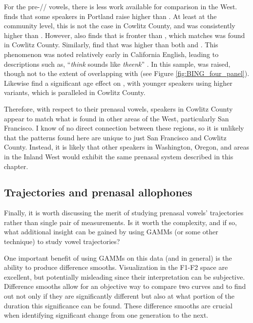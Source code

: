 For the pre-// vowels, there is less work available for comparison in the West. \citet[46]{conn_2000_diss} finds that some speakers in Portland raise \ban higher than \bang. At least at the community level, this is not the case in Cowlitz County, and \bang was consistently higher than \ban. However, \citet{conn_2000_diss} also finds that \bang is fronter than \ban, which matches was found in Cowlitz County. Similarly, \citet[42]{cardoso_etal_2016_pads} find that \bing was higher than both \bit and \bin. This phenomenon was noted relatively early in California English, leading to descriptions such as, ``\textit{think} sounds like \textit{theenk}'' \citep{eckert_2004}. In this sample, \bing was raised, though not to the extent of overlapping with \fleece (see Figure \ref{fig:BING_four_panel}). Likewise \citet{cardoso_etal_2016_pads} find a significant age effect on \bang, with younger speakers using higher variants, which is paralleled in Cowlitz County.

Therefore, with respect to their prenasal vowels, speakers in Cowlitz County appear to match what is found in other areas of the West, particularly San Francisco. I know of no direct connection between these regions, so it is unlikely that the patterns found here are unique to just San Francisco and Cowlitz County. Instead, it is likely that other speakers in Washington, Oregon, and  areas in the Inland West would exhibit the same prenasal system described in this chapter.


\subsection{Trajectories and prenasal allophones}

Finally, it is worth discussing the merit of studying prenasal vowels' trajectories rather than single pair of measurements. Is it worth the complexity, and if so, what additional insight can be gained by using GAMMs (or some other technique) to study vowel trajectories?

One important benefit of using GAMMs on this data (and in general) is the ability to produce difference smooths. Visualization in the F1-F2 space are excellent, but potentially misleading since their interpretation can be subjective. Difference smooths allow for an objective way to compare two curves and to find out not only if they are significantly different but also at what portion of the duration this significance can be found. These difference smooths are crucial when identifying significant change from one generation to the next.

